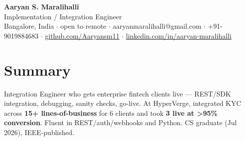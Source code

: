\documentclass[10pt,a4paper]{article}
\begin{document}
\vspace*{-1cm}
\begin{center}
{\LARGE\bfseries Aaryan S. Maralihalli}\\[0.5em]
{\large Implementation / Integration Engineer}\\[0.3em]
Bangalore, India $\cdot$ open to remote $\cdot$ aaryanmaralihalli@gmail.com $\cdot$ +91-9019884683 $\cdot$ \href{https://github.com/Aaryansm11}{github.com/Aaryansm11} $\cdot$ \href{https://linkedin.com/in/aaryan-maralihalli}{linkedin.com/in/aaryan-maralihalli}
\end{center}\vspace{0.4ex}
\section*{Summary}
Integration Engineer who gets enterprise fintech clients live --- REST/SDK integration, debugging, sanity checks, go-live. At HyperVerge, integrated KYC across \textbf{15+ lines-of-business} for 6 clients and took \textbf{3 live at \textgreater{}95\% conversion}. Fluent in REST/auth/webhooks and Python. CS graduate (Jul 2026), IEEE-published.\par\vspace{2pt}
\end{document}
